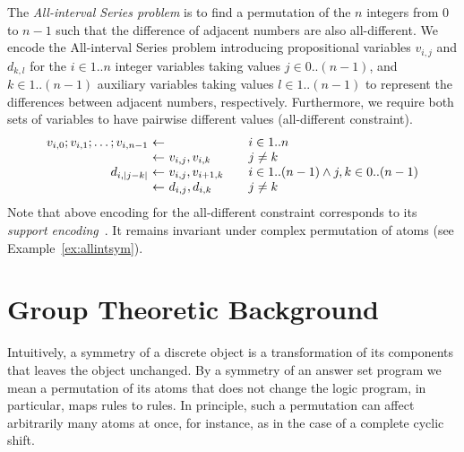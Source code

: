 \documentclass[envcountsame]{llncs}
\begin{document}
\begin{example} \label{ex:allint}
The \emph{All-interval Series problem} is to find a permutation of the $n$ integers from $0$ to $n-1$ such that the difference of adjacent numbers are also all-different. We encode the All-interval Series problem introducing propositional variables $v_{i,j}$ and $d_{k,l}$ for the $i \in 1..n$ integer variables taking values $j\in 0..(n-1)$, and $k \in 1..(n-1)$ auxiliary variables taking values $l \in 1..(n-1)$ to represent the differences between adjacent numbers, respectively. Furthermore, we require both sets of variables to have pairwise different values (all-different constraint).
\[
\begin{array}{r@{\ \leftarrow\ }l@{\qquad}l}
v_{i,0} ; v_{i,1} ; \dots ; v_{i,n-1} &  & i \in 1..n\\
& v_{i,j}, v_{i,k} & j \neq k \\
d_{i,|j-k|} & v_{i,j}, v_{i+1,k} & i \in 1..(n-1) \land j,k \in 0..(n-1)\\
& d_{i,j}, d_{i,k} & j \neq k \\
\end{array}
\]
Note that above encoding for the all-different constraint corresponds to its \emph{support encoding}~\cite{drwa10a}. It remains invariant under complex permutation of atoms (see Example~\ref{ex:allintsym}).
\end{example}

\section{Group Theoretic Background}
Intuitively, a symmetry of a discrete object is a transformation of its components that leaves the object unchanged. By a symmetry of an answer set program we mean a permutation of its atoms that does not change the logic program, in particular, maps rules to rules. In principle, such a permutation can affect arbitrarily many atoms at once, for instance, as in the case of a complete cyclic shift.
\end{document}
